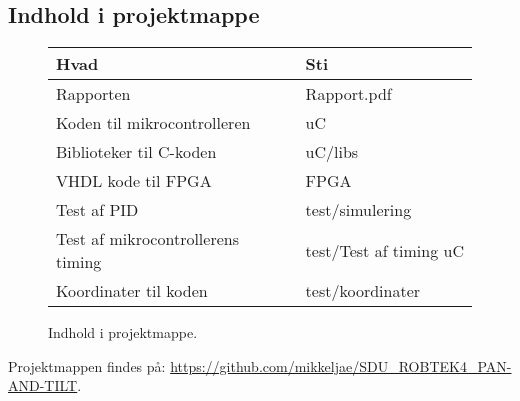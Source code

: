 \newpage

\tableofcontents
\listoffigures
\listoftables  

\subsection*{Indhold i projektmappe}
\begin{figure}[th!]
\centering
\begin{tabular}{l|l}
Hvad&Sti\\\hline
Rapporten&Rapport.pdf\\
Koden til mikrocontrolleren &uC\\
Biblioteker til C-koden&uC/libs\\
VHDL kode til FPGA &FPGA\\
Test af PID &test/simulering\\
Test af mikrocontrollerens timing&test/Test af timing uC\\
Koordinater til koden &test/koordinater\\

\end{tabular}
\captionsetup{type=table, width=0.6\textwidth}
\caption*{Indhold i projektmappe. \label{tb:CD}}
\end{figure}

Projektmappen findes på:  \url{https://github.com/mikkeljae/SDU_ROBTEK4_PAN-AND-TILT}.


 \listoftodos